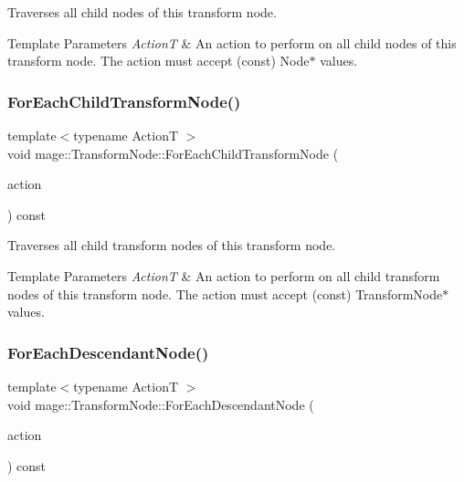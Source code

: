 Traverses all child nodes of this transform node.


\begin{DoxyTemplParams}{Template Parameters}
{\em ActionT} & An action to perform on all child nodes of this transform node. The action must accept ({\ttfamily const}) {\ttfamily Node$\ast$} values. \\
\hline
\end{DoxyTemplParams}
\hypertarget{classmage_1_1_transform_node_ad9c166b58e3718125d2a51827f8d7ca2}{}\label{classmage_1_1_transform_node_ad9c166b58e3718125d2a51827f8d7ca2} 
\subsubsection{\texorpdfstring{For\+Each\+Child\+Transform\+Node()}{ForEachChildTransformNode()}}
{\footnotesize\ttfamily template$<$typename ActionT $>$ \\
void mage\+::\+Transform\+Node\+::\+For\+Each\+Child\+Transform\+Node (\begin{DoxyParamCaption}\item[{ActionT}]{action }\end{DoxyParamCaption}) const\hspace{0.3cm}{\ttfamily [private]}}

Traverses all child transform nodes of this transform node.


\begin{DoxyTemplParams}{Template Parameters}
{\em ActionT} & An action to perform on all child transform nodes of this transform node. The action must accept ({\ttfamily const}) {\ttfamily Transform\+Node$\ast$} values. \\
\hline
\end{DoxyTemplParams}
\hypertarget{classmage_1_1_transform_node_a696d23bd936d3c3f880cb8b5cfd54d80}{}\label{classmage_1_1_transform_node_a696d23bd936d3c3f880cb8b5cfd54d80} 
\subsubsection{\texorpdfstring{For\+Each\+Descendant\+Node()}{ForEachDescendantNode()}}
{\footnotesize\ttfamily template$<$typename ActionT $>$ \\
void mage\+::\+Transform\+Node\+::\+For\+Each\+Descendant\+Node (\begin{DoxyParamCaption}\item[{ActionT}]{action }\end{DoxyParamCaption}) const\hspace{0.3cm}{\ttfamily [private]}}

